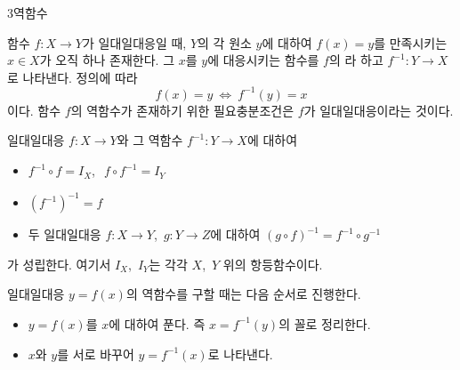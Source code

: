 \documentclass[10pt]{article}
\begin{document}
\dmchecktitle



\newpage

\dmconcepthead
{}

\begin{dmconcept}{3}{역함수}
\setlength{\parskip}{2.0mm plus 2.1mm minus 0mm}\linespread{1.30}\selectfont%


함수 $f : X \to Y$가 일대일대응일 때, $Y$의 각 원소 $y$에 대하여 $f(x) = y$를 만족시키는 $x \in X$가 오직 하나 존재한다. 그 $x$를 $y$에 대응시키는 함수를 $f$의 라 하고 $f^{-1} : Y \to X$로 나타낸다. 정의에 따라
\begin{equation*}
  f(x) = y \ \Longleftrightarrow\ f^{-1}(y) = x
\end{equation*}
이다. 함수 $f$의 역함수가 존재하기 위한 필요충분조건은 $f$가 일대일대응이라는 것이다.


일대일대응 $f : X \to Y$와 그 역함수 $f^{-1} : Y \to X$에 대하여
\begin{itemize}[leftmargin=8mm, itemsep=0.5mm, topsep=1mm]
  \item $f^{-1} \circ f = I_{X}$,\ $\ f \circ f^{-1} = I_{Y}$
  \item $(f^{-1})^{-1} = f$
  \item 두 일대일대응 $f : X \to Y$,\ $g : Y \to Z$에 대하여 $(g \circ f)^{-1} = f^{-1} \circ g^{-1}$
\end{itemize}
가 성립한다. 여기서 $I_{X}$,\ $I_{Y}$는 각각 $X$,\ $Y$ 위의 항등함수이다.


일대일대응 $y = f(x)$의 역함수를 구할 때는 다음 순서로 진행한다.
\begin{itemize}[leftmargin=8mm, itemsep=0.5mm, topsep=1mm]
  \item $y = f(x)$를 $x$에 대하여 푼다. 즉 $x = f^{-1}(y)$의 꼴로 정리한다.
  \item $x$와 $y$를 서로 바꾸어 $y = f^{-1}(x)$로 나타낸다.
\end{itemize}


\end{dmconcept}
\end{document}

